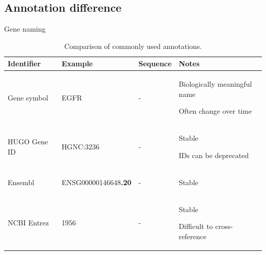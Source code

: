 \subsection{Annotation difference}


Gene naming \cite{fujiyoshik_oginos:OpinionStandardizing2021}
\cite{brufordea_tweedies:GuidelinesHuman2020}

\begin{SingleSpace}
\begin{table}[tbp]
    \centering
    \caption{Comparison of commonly used annotations.}
    \label{tab:intro-anno}

    \footnotesize
    \begin{subtable}{1\linewidth}
        \centering
        \label{tab:intro-anno-gene}
        \begin{tabular}{lllp{15em}}
            \toprule
            Identifier      & Example   & Sequence  & Notes \\
            \midrule
            Gene symbol     & EGFR      & -         &
            \begin{tablist}
                \item Biologically meaningful name
                \item Often change over time
            \end{tablist}\\
            HUGO Gene ID    & HGNC:3236 & -         &
            \begin{tablist}
                \item Stable
                \item IDs can be deprecated
            \end{tablist}\\
            Ensembl         & ENSG00000146648\textbf{.20} & - &
            \begin{tablist}
                \item Stable
            \end{tablist} \\
            NCBI Entrez	    & 1956      & -         &
            \begin{tablist}
                \item Stable
                \item Difficult to cross-reference
            \end{tablist} \\
            \bottomrule
        \end{tabular}
    \end{subtable}


\end{table}
\end{SingleSpace}
